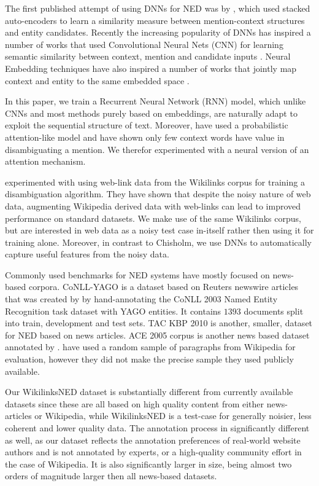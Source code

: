 \documentclass[11pt]{article}
\begin{document}
The first published attempt of using DNNs for NED was by , which used stacked auto-encoders to learn a similarity measure between mention-context structures and entity candidates. Recently the increasing popularity of DNNs has inspired a number of works that used Convolutional Neural Nets (CNN) for learning semantic similarity between context, mention and candidate inputs \cite{sun2015modeling,francis2016capturing}. Neural Embedding techniques have also inspired a number of works that jointly map context and entity to the same embedded space \cite{yamada2016joint,Melamud2014}.

In this paper, we train a Recurrent Neural Network (RNN) model, which unlike CNNs and most methods purely based on embeddings, are naturally adapt to exploit the sequential structure of text. Moreover,  have used a probabilistic attention-like model and have shown only few context words have value in disambiguating a mention. We therefor experimented with a neural version of an attention mechanism.

 experimented with using web-link data from the Wikilinks corpus \cite{singh12:wiki-links} for training a disambiguation algorithm. They have shown that despite the noisy nature of web data, augmenting Wikipedia derived data with web-links can lead to improved performance on standard datasets. We make use of the same Wikilinks corpus, but are interested in web data as a noisy test case in-itself rather then using it for training alone. Moreover, in contrast to Chisholm, we use DNNs to automatically capture useful features from the noisy data.

Commonly used benchmarks for NED systems have mostly focused on news-based corpora. CoNLL-YAGO is a dataset based on Reuters newswire articles that was created by  by hand-annotating the CoNLL 2003 Named Entity Recognition task dataset with YAGO entities. It contains $1393$ documents split into train, development and test sets. TAC KBP 2010 \cite{ji2010overview} is another, smaller, dataset for NED based on news articles. ACE 2005 corpus is another news based dataset annotated by .  have used a random sample of paragraphs from Wikipedia for evaluation, however they did not make the precise sample they used publicly available. 

Our WikilinksNED dataset is substantially different from currently available datasets since these are all based on high quality content from either news-articles or Wikipedia, while WikilinksNED is a test-case for generally noisier, less coherent and lower quality data. The annotation process in significantly different as well, as our dataset reflects the annotation preferences of real-world website authors and is not annotated by experts, or a high-quality community effort in the case of Wikipedia. It is also significantly larger in size, being almost two orders of magnitude larger then all news-based datasets.
\end{document}
